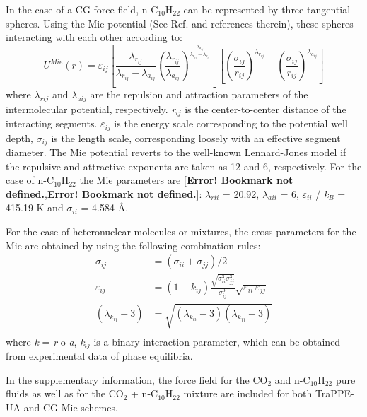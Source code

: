 \documentclass{scrbook}
\begin{document}
In the case of a CG force field, n-C$_{10}$H$_{22}$ can be represented by three
tangential spheres. Using the Mie potential (See Ref. \citep{muller2014} and
references therein), these spheres interacting with each other according to:
\begin{equation}
U^{Mie}\left(r\right)=\varepsilon_{ij}\left[\frac{\lambda_{r_{ij}}}{\lambda_{r_{ij}}-\lambda_{a_{ij}}}\left(\frac{\lambda_{r_{ij}}}{\lambda_{a_{ij}}}\right)^{\frac{\lambda_{a_{ij}}}{\lambda_{r_{ij}}-\lambda_{a_{ij}}}}\right]\left[\left(\frac{\sigma_{ij}}{r_{ij}}\right)^{\lambda_{r_{ij}}}-\left(\frac{\sigma_{ij}}{r_{ij}}\right)^{\lambda_{a_{ij}}}\right]
\end{equation}
where {${\lambda}$}$_{rij}$ and {${\lambda}$}$_{aij}$ are the repulsion and
attraction parameters of the intermolecular potential, respectively.
\textit{r}$_{ij}$ is the center-to-center distance of the interacting segments.
${\varepsilon}$$_{ij}$ is the energy scale corresponding to the potential well
depth, ${\sigma}$$_{ij}$ is the length scale, corresponding loosely with an
effective segment diameter. The Mie potential reverts to the well-known
Lennard-Jones model if the repulsive and attractive exponents are taken as 12
and 6, respectively. For the case of n-C$_{10}$H$_{22}$ the Mie parameters are
[\textbf{Error! Bookmark not defined.},\textbf{Error! Bookmark not defined.}]:
{${\lambda}$}$_{rii}$ = 20.92, {${\lambda}$}$_{aii}$ = 6,
${\varepsilon}$$_{ii}$ / \textit{k}$_{B}$ = 415.19 K and ${\sigma}$$_{ii}$
= 4.584 \AA{}.

For the case of heteronuclear molecules or mixtures, the cross parameters for the Mie are obtained by using the following combination rules:
\begin{align}
  \sigma_{ij} &= \left(\sigma_{ii}+\sigma_{jj}\right)/2 \\
  \varepsilon_{ij} &= \left(1-k_{ij}\right)\frac{\sqrt{\sigma_{ii}^{3}\sigma_{jj}^{3}}}{\sigma_{ij}^{3}}\sqrt{\varepsilon_{ii}\,\varepsilon_{jj}} \\
  \left(\lambda_{k_{ij}}-3\right) &= \sqrt{\left(\lambda_{k_{ii}}-3\right)\left(\lambda_{k_{jj}}-3\right)} \\
\end{align}
where \textit{k} = \textit{r} o \textit{a}, \textit{k}$_{ij}$ is a binary
interaction parameter, which can be obtained from experimental data of phase
equilibria.

In the supplementary information, the force field for the CO$_{2}$ and
n-C$_{10}$H$_{22}$ pure fluids as well as for the CO$_{2}$ + n-C$_{10}$H$_{22}$
mixture are included for both TraPPE-UA and CG-Mie schemes.
\end{document}
